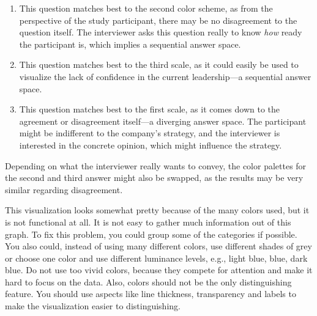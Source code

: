     \begin{exercise} \hfill
        \begin{enumerate}
            \item This question matches best to the second color scheme, as from the perspective of the study participant, there may be no disagreement to the question itself.
            The interviewer asks this question really to know \emph{how} ready the participant is, which implies a sequential answer space.
            \item This question matches best to the third scale, as it could easily be used to visualize the lack of confidence in the current leadership---a sequential answer space.
            \item This question matches best to the first scale, as it comes down to the agreement or disagreement itself---a diverging answer space.
            The participant might be indifferent to the company's strategy, and the interviewer is interested in the concrete opinion, which might influence the strategy.
        \end{enumerate}
        Depending on what the interviewer really wants to convey, the color palettes for the second and third answer might also be swapped, as the results may be very similar regarding disagreement.
    \end{exercise}

    \pagebreak

    \begin{exercise}
        This visualization looks somewhat pretty because of the many colors used, but it is not functional at all.
        It is not easy to gather much information out of this graph.
        To fix this problem, you could group some of the categories if possible.
        You also could, instead of using many different colors, use different shades of grey or choose one color and use different luminance levels, e.g., light blue, blue, dark blue.
        Do not use too vivid colors, because they compete for attention and make it hard to focus on the data.
        Also, colors should not be the only distinguishing feature.
        You should use aspects like line thickness, transparency and labels to make the visualization
        easier to distinguishing.
    \end{exercise}

